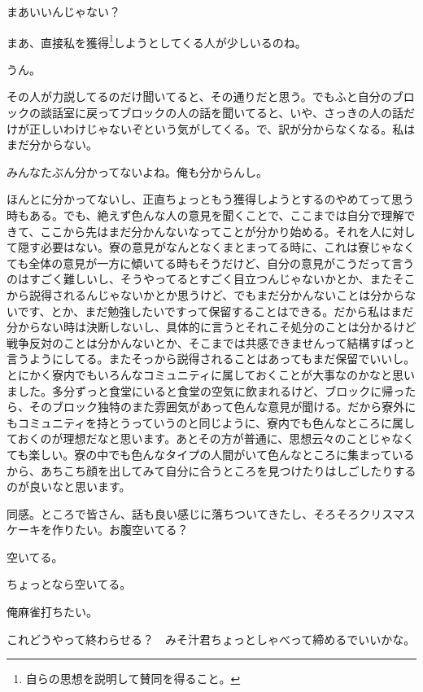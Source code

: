 \begin{multicols}{2}
まあいいんじゃない？

まあ、直接私を獲得\footnote{自らの思想を説明して賛同を得ること。}しようとしてくる人が少しいるのね。

うん。

その人が力説してるのだけ聞いてると、その通りだと思う。でもふと自分のブロックの談話室に戻ってブロックの人の話を聞いてると、いや、さっきの人の話だけが正しいわけじゃないぞという気がしてくる。で、訳が分からなくなる。私はまだ分からない。

みんなたぶん分かってないよね。俺も分からんし。

ほんとに分かってないし、正直ちょっともう獲得しようとするのやめてって思う時もある。でも、絶えず色んな人の意見を聞くことで、ここまでは自分で理解できて、ここから先はまだ分かんないなってことが分かり始める。それを人に対して隠す必要はない。寮の意見がなんとなくまとまってる時に、これは寮じゃなくても全体の意見が一方に傾いてる時もそうだけど、自分の意見がこうだって言うのはすごく難しいし、そうやってるとすごく目立つんじゃないかとか、またそこから説得されるんじゃないかとか思うけど、でもまだ分かんないことは分からないです、とか、まだ勉強したいですって保留することはできる。だから私はまだ分からない時は決断しないし、具体的に言うとそれこそ処分のことは分かるけど戦争反対のことは分かんないとか、そこまでは共感できませんって結構すぱっと言うようにしてる。またそっから説得されることはあってもまだ保留でいいし。とにかく寮内でもいろんなコミュニティに属しておくことが大事なのかなと思いました。多分ずっと食堂にいると食堂の空気に飲まれるけど、ブロックに帰ったら、そのブロック独特のまた雰囲気があって色んな意見が聞ける。だから寮外にもコミュニティを持とうっていうのと同じように、寮内でも色んなところに属しておくのが理想だなと思います。あとその方が普通に、思想云々のことじゃなくても楽しい。寮の中でも色んなタイプの人間がいて色んなところに集まっているから、あちこち顔を出してみて自分に合うところを見つけたりはしごしたりするのが良いなと思います。

同感。ところで皆さん、話も良い感じに落ちついてきたし、そろそろクリスマスケーキを作りたい。お腹空いてる？

空いてる。

ちょっとなら空いてる。

俺麻雀打ちたい。

これどうやって終わらせる？　みそ汁君ちょっとしゃべって締めるでいいかな。


\end{multicols}
